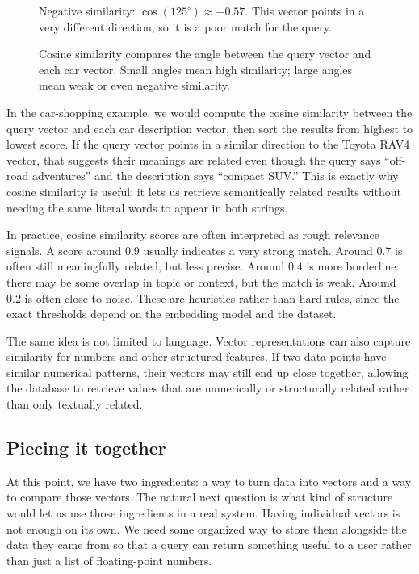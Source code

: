 \documentclass[12pt]{article}
\begin{document}
\begin{figure}[h]
\begin{minipage}[t]{0.31\textwidth}
\vspace{0.2em}
\scriptsize Negative similarity: $\cos(125^\circ) \approx -0.57$. This
vector points in a very different direction, so it is a poor match for the
query.
\end{minipage}
\caption{Cosine similarity compares the angle between the query vector and
each car vector. Small angles mean high similarity; large angles mean weak
or even negative similarity.}
\end{figure}

In the car-shopping example, we would compute the cosine similarity
between the query vector and each car description vector, then sort the
results from highest to lowest score. If the query vector points in a
similar direction to the Toyota RAV4 vector, that suggests their meanings
are related even though the query says ``off-road adventures'' and the
description says ``compact SUV.'' This is exactly why cosine similarity is
useful: it lets us retrieve semantically related results without needing
the same literal words to appear in both strings.

In practice, cosine similarity scores are often interpreted as rough
relevance signals. A score around $0.9$ usually indicates a very strong
match. Around $0.7$ is often still meaningfully related, but less precise.
Around $0.4$ is more borderline: there may be some overlap in topic or
context, but the match is weak. Around $0.2$ is often close to noise.
These are heuristics rather than hard rules, since the exact thresholds
depend on the embedding model and the dataset.

The same idea is not limited to language. Vector representations can also
capture similarity for numbers and other structured features. If two data
points have similar numerical patterns, their vectors may still end up
close together, allowing the database to retrieve values that are
numerically or structurally related rather than only textually related.

\subsection{Piecing it together}

At this point, we have two ingredients: a way to turn data into vectors
and a way to compare those vectors. The natural next question is what
kind of structure would let us use those ingredients in a real system.
Having individual vectors is not enough on its own. We need some
organized way to store them alongside the data they came from so that a
query can return something useful to a user rather than just a list of
floating-point numbers.
\end{document}

